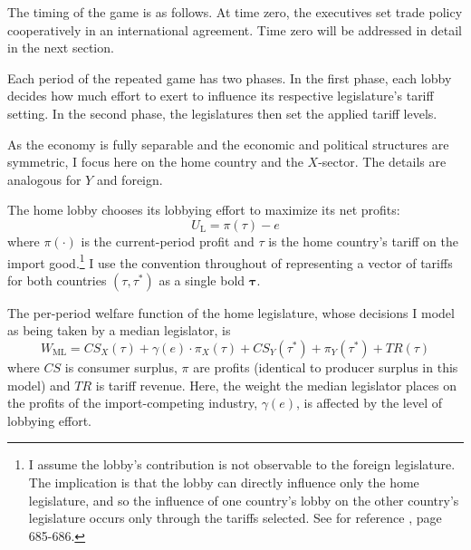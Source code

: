 \documentclass[authoryear, review]{elsarticle}
\newcommand{\ga}{\gamma}
\begin{document}
The timing of the game is as follows. At time zero, the executives set trade policy cooperatively in an international agreement. Time zero will be addressed in detail in the next section. 

Each period of the repeated game has two phases. In the first phase, each lobby decides how much effort to exert to influence its respective legislature's tariff setting. In the second phase, the legislatures then set the applied tariff levels.

As the economy is fully separable and the economic and political structures are symmetric, I focus here on the home country and the $X$-sector. The details are analogous for $Y$ and foreign.

The home lobby chooses its lobbying effort to maximize its net profits:
\begin{equation}
  U_\text{L} = \pi(\tau)-e
  \label{eq:lv3}
\end{equation}
where $\pi(\cdot)$ is the current-period profit and $\tau$ is the home country's tariff on the import good.\footnote{I assume the lobby's contribution is not observable to the foreign legislature. The implication is that the lobby can directly influence only the home legislature, and so the influence of one country's lobby on the other country's legislature occurs only through the tariffs selected. See for reference \citet{gh95}, page 685-686.} I use the convention throughout of representing a vector of tariffs for both countries $(\tau,\tau^*)$ as a single bold $\bm{\tau}$. 


The per-period welfare function of the home legislature, whose decisions I model as being taken by a median legislator, is
\begin{equation}
  W_\text{ML} = \mathit{CS}_X(\tau) + \ga(e) \cdot \pi_X(\tau) + \mathit{CS}_Y(\tau^*) + \pi_Y(\tau^*) + \mathit{TR}(\tau)
  \label{eq:ml3}
\end{equation}
where $\mathit{CS}$ is consumer surplus, $\pi$ are profits (identical to producer surplus in this model) and $\mathit{TR}$ is tariff revenue. Here, the weight the median legislator places on the profits of the import-competing industry, $\ga(e)$, is affected by the level of lobbying effort.
\end{document}

